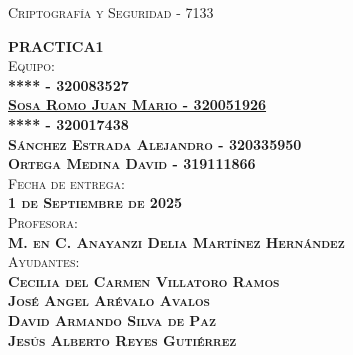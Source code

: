 \begin{titlepage}
\begin{minipage}[c][0.81\textheight][t]{0.75\textwidth}
\begin{center}
			{\large\scshape Criptografía y Seguridad - 7133}\\[.2in]
			
			\vspace{2cm}            
			
			\textsc{\LARGE \textbf{P}\hspace{1cm}\textbf{R}\hspace{1cm}\textbf{A}\hspace{1cm}\textbf{C}\hspace{1cm}\textbf{T}\hspace{1cm}\textbf{I}\hspace{1cm}\textbf{C}\hspace{1cm}\textbf{A}\hspace{1.3cm}\textbf{1}}\\[2cm]
			\textsc{\Large{Equipo:}\normalsize \\
                \vspace{.3cm}
				\textbf{**** - 320083527 \\
                \vspace{.2cm}
				\href{https://github.com/JuanSosaCiencias}{{Sosa Romo Juan Mario - 320051926}} \\
                \vspace{.2cm}
				**** - 320017438 \\
                \vspace{.2cm}
                Sánchez Estrada Alejandro - 320335950 \\
                \vspace{.2cm}
                Ortega Medina David - 319111866}}\\[0.5cm]     
			
			\textsc{{Fecha de entrega: \\ \textbf{1 de Septiembre de 2025}}}\\[0.5cm]        
			
			\textsc{{Profesora: \\ \textbf{M. en C. Anayanzi Delia Martínez Hernández}}}\\[0.5cm]  
			
			\textsc{Ayudantes: \\ \textbf{Cecilia del Carmen Villatoro Ramos \\ José Angel Arévalo Avalos \\ David Armando Silva de Paz \\ Jesús Alberto Reyes Gutiérrez
			} }
			
			
			\vspace{0.5cm}
		\end{center}
	\end{minipage}
\end{titlepage}
